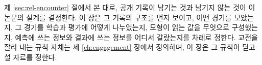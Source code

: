 제 \ref{sec:rel-encounter} 절에서 본 대로, 공개 기록이 남기는 것과 남기지 않는 것이 이 논문의 설계를 결정한다. 이 장은 그 기록의 구조를 먼저 보이고, 어떤 경기를 모았는지, 그 경기를 학습과 평가에 어떻게 나누었는지, 모형이 읽는 값을 무엇으로 구성했는지, 예측에 쓰는 정보와 결과에 쓰는 정보를 어디서 갈랐는지를 차례로 정한다. 교전을 잘라 내는 규칙 자체는 제 \ref{ch:engagement} 장에서 정의하며, 이 장은 그 규칙이 딛고 설 자료를 정한다.
